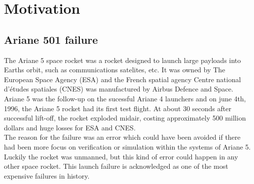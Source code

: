 \section{Motivation}
\subsection{Ariane 501 failure}
The Ariane 5 space rocket\cite{InquiryBoard1996} was a rocket designed to launch large payloads into Earths orbit, such as communications satelites, etc. It was owned by The European Space Agency (ESA) and the French spatial agency Centre national d'\'etudes spatiales (CNES) was manufactured by Airbus Defence and Space.\\ Ariane 5 was the follow-up on the sucessful Ariane 4 launchers and on june 4th, 1996, the Ariane 5 rocket had its first test flight. At about 30 seconds after successful lift-off, the rocket exploded midair, costing approximately 500 million dollars and huge losses for ESA and CNES. \\ The reason for the failure was an error which could have been avoided if there had been more focus on verification or simulation within the systems of Ariane 5. Luckily the rocket was unmanned, but this kind of error could happen in any other space rocket. This launch failure is acknowledged as one of the most expensive failures in history. \\

